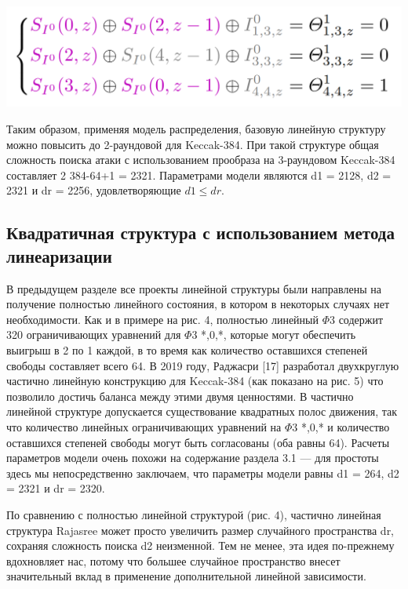 \documentclass[utf8,14pt,a4paper,oneside,russian]{book}
\begin{document}
\begin{center}
    \includegraphics*[scale=0.45]{14}
\end{center}

Таким образом, применяя модель распределения, базовую линейную структуру можно
повысить до 2-раундовой для Keccak-384. При такой структуре общая
сложность поиска атаки с использованием прообраза на 3-раундовом Keccak-384 составляет 2
384-64+1 = 2321. Параметрами модели являются d1 = 2128, d2 = 2321 и dr = 2256, удовлетворяющие $d1 \leq dr$.

\subsection*{Квадратичная структура с использованием метода линеаризации}

В предыдущем разделе все проекты линейной структуры были направлены на получение полностью линейного состояния,
в котором в некоторых случаях нет необходимости. Как и в примере на рис. 4, полностью линейный $\Phi3$ содержит 320
ограничивающих уравнений для $\Phi3$ *,0,*, которые могут обеспечить выигрыш в 2 по 1 каждой,
в то время как количество оставшихся степеней свободы составляет всего 64. В 2019 году,
Раджасри [17] разработал двухкруглую частично линейную конструкцию для Keccak-384 (как
показано на рис. 5) что позволило достичь баланса между этими двумя ценностями.
В частично линейной структуре допускается существование квадратных полос движения, так что
количество линейных ограничивающих уравнений на $\Phi3$ *,0,* и количество оставшихся степеней
свободы могут быть согласованы (оба равны 64). Расчеты параметров модели
очень похожи на содержание раздела 3.1 — для простоты здесь мы непосредственно
заключаем, что параметры модели равны d1 = 264, d2 = 2321 и dr = 2320.

По сравнению с полностью линейной структурой (рис. 4), частично линейная
структура Rajasree может просто увеличить размер случайного пространства dr, сохраняя сложность поиска d2 неизменной. Тем не менее, эта идея по-прежнему вдохновляет нас, потому что
большее случайное пространство внесет значительный вклад в применение дополнительной линейной
зависимости.
\end{document}
